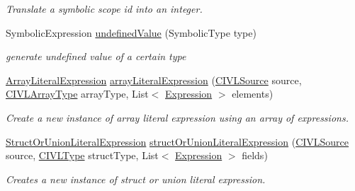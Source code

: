 \begin{DoxyCompactItemize}
\begin{DoxyCompactList}\small\item\em Translate a symbolic scope id into an integer. \end{DoxyCompactList}\item 
Symbolic\+Expression \hyperlink{classedu_1_1udel_1_1cis_1_1vsl_1_1civl_1_1model_1_1common_1_1CommonModelFactory_a641e599a65cc967b51d27d2f96950cce}{undefined\+Value} (Symbolic\+Type type)
\begin{DoxyCompactList}\small\item\em generate undefined value of a certain type \end{DoxyCompactList}\item 
\hyperlink{interfaceedu_1_1udel_1_1cis_1_1vsl_1_1civl_1_1model_1_1IF_1_1expression_1_1ArrayLiteralExpression}{Array\+Literal\+Expression} \hyperlink{classedu_1_1udel_1_1cis_1_1vsl_1_1civl_1_1model_1_1common_1_1CommonModelFactory_a4d46b43d80752809a3dfcadaa20134ff}{array\+Literal\+Expression} (\hyperlink{interfaceedu_1_1udel_1_1cis_1_1vsl_1_1civl_1_1model_1_1IF_1_1CIVLSource}{C\+I\+V\+L\+Source} source, \hyperlink{interfaceedu_1_1udel_1_1cis_1_1vsl_1_1civl_1_1model_1_1IF_1_1type_1_1CIVLArrayType}{C\+I\+V\+L\+Array\+Type} array\+Type, List$<$ \hyperlink{interfaceedu_1_1udel_1_1cis_1_1vsl_1_1civl_1_1model_1_1IF_1_1expression_1_1Expression}{Expression} $>$ elements)
\begin{DoxyCompactList}\small\item\em Create a new instance of array literal expression using an array of expressions. \end{DoxyCompactList}\item 
\hyperlink{interfaceedu_1_1udel_1_1cis_1_1vsl_1_1civl_1_1model_1_1IF_1_1expression_1_1StructOrUnionLiteralExpression}{Struct\+Or\+Union\+Literal\+Expression} \hyperlink{classedu_1_1udel_1_1cis_1_1vsl_1_1civl_1_1model_1_1common_1_1CommonModelFactory_a5170ff681017750ce18cd2de759af310}{struct\+Or\+Union\+Literal\+Expression} (\hyperlink{interfaceedu_1_1udel_1_1cis_1_1vsl_1_1civl_1_1model_1_1IF_1_1CIVLSource}{C\+I\+V\+L\+Source} source, \hyperlink{interfaceedu_1_1udel_1_1cis_1_1vsl_1_1civl_1_1model_1_1IF_1_1type_1_1CIVLType}{C\+I\+V\+L\+Type} struct\+Type, List$<$ \hyperlink{interfaceedu_1_1udel_1_1cis_1_1vsl_1_1civl_1_1model_1_1IF_1_1expression_1_1Expression}{Expression} $>$ fields)
\begin{DoxyCompactList}\small\item\em Creates a new instance of struct or union literal expression. \end{DoxyCompactList}\item 

\end{DoxyCompactItemize}
